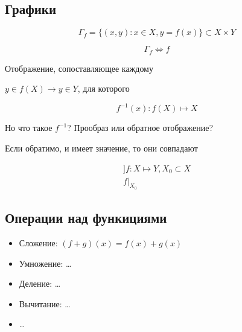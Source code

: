 \documentclass[12pt, a4paper]{article}
\begin{document}
  \subsection{Графики}
  \begin{definition}
  \begin{equation}
    \Gamma_f = \{(x, y): x \in X, y = f(x)\} \subset X \times Y
  \end{equation}
  \end{definition}

  \begin{theorem}
  \begin{equation}
    \Gamma_f \Longleftrightarrow f
  \end{equation}
  \end{theorem}

  \begin{definition}
  Отображение, сопоставляющее каждому 

  $y \in f(X) \longrightarrow y \in Y$, для которого   
  \end{definition}

  \begin{equation}
  f^{-1}(x): f(X) \mapsto X
  \end{equation}

  Но что такое $f^{-1}$? Прообраз или обратное отображение?

  Если обратимо, и имеет значение, то они совпадают

  \begin{definition}
  \begin{gather}
    ]f: X \mapsto Y, X_0 \subset X \\
    f|_{X_0}
  \end{gather}
  \end{definition}


  \subsection{Операции над функициями}

  \begin{itemize}
  \item Сложение: $(f + g)(x) = f(x) + g(x)$
  \item Умножение: \ldots
  \item Деление: \ldots
  \item Вычитание: \ldots
  \item \ldots
  \end{itemize}
\end{document}
